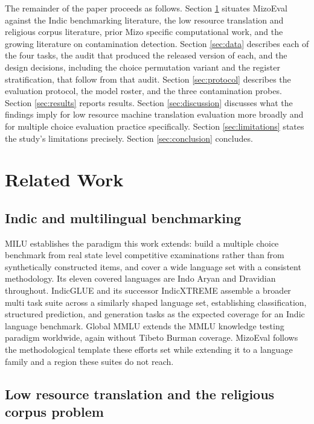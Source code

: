\documentclass[pdflatex,sn-mathphys-ay]{sn-jnl}
\begin{document}
The remainder of the paper proceeds as follows. Section \ref{sec:related} situates MizoEval against the Indic benchmarking literature, the low resource translation and religious corpus literature, prior Mizo specific computational work, and the growing literature on contamination detection. Section \ref{sec:data} describes each of the four tasks, the audit that produced the released version of each, and the design decisions, including the choice permutation variant and the register stratification, that follow from that audit. Section \ref{sec:protocol} describes the evaluation protocol, the model roster, and the three contamination probes. Section \ref{sec:results} reports results. Section \ref{sec:discussion} discusses what the findings imply for low resource machine translation evaluation more broadly and for multiple choice evaluation practice specifically. Section \ref{sec:limitations} states the study's limitations precisely. Section \ref{sec:conclusion} concludes.

\section{Related Work}
\label{sec:related}

\subsection{Indic and multilingual benchmarking}

MILU \citep{verma2025milu} establishes the paradigm this work extends: build a multiple choice benchmark from real state level competitive examinations rather than from synthetically constructed items, and cover a wide language set with a consistent methodology. Its eleven covered languages are Indo Aryan and Dravidian throughout. IndicGLUE \citep{kakwani2020indicnlpsuite} and its successor IndicXTREME \citep{doddapaneni2023indicxtreme} assemble a broader multi task suite across a similarly shaped language set, establishing classification, structured prediction, and generation tasks as the expected coverage for an Indic language benchmark. Global MMLU \citep{singh2024globalmmlu} extends the MMLU knowledge testing paradigm worldwide, again without Tibeto Burman coverage. MizoEval follows the methodological template these efforts set while extending it to a language family and a region these suites do not reach.

\subsection{Low resource translation and the religious corpus problem}
\end{document}
